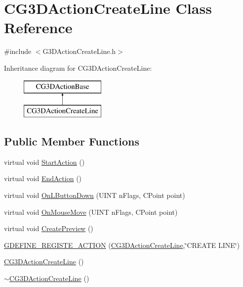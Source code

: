\hypertarget{class_c_g3_d_action_create_line}{}\section{C\+G3\+D\+Action\+Create\+Line Class Reference}
\label{class_c_g3_d_action_create_line}


{\ttfamily \#include $<$G3\+D\+Action\+Create\+Line.\+h$>$}

Inheritance diagram for C\+G3\+D\+Action\+Create\+Line\+:\begin{figure}[H]
\begin{center}
\leavevmode
\includegraphics[height=2.000000cm]{class_c_g3_d_action_create_line}
\end{center}
\end{figure}
\subsection*{Public Member Functions}
\begin{DoxyCompactItemize}
\item 
virtual void \hyperlink{class_c_g3_d_action_create_line_a35ac8fd2cabe6090a6853c38975deeec}{Start\+Action} ()
\item 
virtual void \hyperlink{class_c_g3_d_action_create_line_add942590d89b1cd53fe4723cf8d54f02}{End\+Action} ()
\item 
virtual void \hyperlink{class_c_g3_d_action_create_line_a37425d6f7e78ebf4e4e457c7bdf69ded}{On\+L\+Button\+Down} (U\+I\+N\+T n\+Flags, C\+Point point)
\item 
virtual void \hyperlink{class_c_g3_d_action_create_line_ad313c05b01dd1a7d84a11a5b153f4e01}{On\+Mouse\+Move} (U\+I\+N\+T n\+Flags, C\+Point point)
\item 
virtual void \hyperlink{class_c_g3_d_action_create_line_a9cd5c5ca033f832e895441fd3b60777f}{Create\+Preview} ()
\item 
\hyperlink{class_c_g3_d_action_create_line_a5d0d1f4d153549458c631f8d0b495be7}{G\+D\+E\+F\+I\+N\+E\+\_\+\+R\+E\+G\+I\+S\+T\+E\+\_\+\+A\+C\+T\+I\+O\+N} (\hyperlink{class_c_g3_d_action_create_line}{C\+G3\+D\+Action\+Create\+Line},\char`\"{}C\+R\+E\+A\+T\+E L\+I\+N\+E\char`\"{})
\item 
\hyperlink{class_c_g3_d_action_create_line_af3208d37b3cd0f7ab8d68f4e05eb413f}{C\+G3\+D\+Action\+Create\+Line} ()
\item 
\hyperlink{class_c_g3_d_action_create_line_a7fe006174c4ebafd7930d1456dfda752}{$\sim$\+C\+G3\+D\+Action\+Create\+Line} ()
\end{DoxyCompactItemize}
